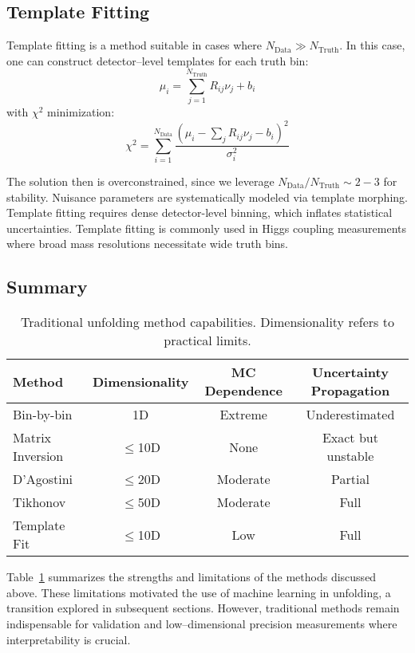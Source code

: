 \subsection{Template Fitting}  
Template fitting is a method suitable in cases where \(N_{\text{Data}} \gg N_{\text{Truth}}\).
%
In this case, one can construct detector--level templates for each truth bin:  
\begin{equation}
    \mu_i = \sum_{j=1}^{N_{\text{Truth}}} R_{ij} \nu_j + b_i
\end{equation}  
with \(\chi^2\) minimization:  
\begin{equation}
    \chi^2 = \sum_{i=1}^{N_{\text{Data}}} \frac{(\mu_i - \sum_j R_{ij}\nu_j - b_i)^2}{\sigma_i^2}
\end{equation}  

The solution then is overconstrained, since we leverage \(N_{\text{Data}}/N_{\text{Truth}} \sim 2-3\) for stability.
%
Nuisance parameters are systematically modeled via template morphing.
%
Template fitting requires dense detector-level binning, which inflates statistical uncertainties. Template fitting is commonly used in Higgs coupling measurements where broad mass resolutions necessitate wide truth bins.

\subsection{Summary}  
\begin{table}
    \centering
    \begin{tabular}{lccc}
        \hline
        Method & Dimensionality & MC Dependence & Uncertainty Propagation \\
        \hline
        Bin-by-bin & 1D & Extreme & Underestimated \\
        Matrix Inversion & $\leq$10D & None & Exact but unstable \\
        D’Agostini & $\leq$20D & Moderate & Partial \\
        Tikhonov & $\leq$50D & Moderate & Full \\
        Template Fit & $\leq$10D & Low & Full \\
        \hline
    \end{tabular}
    \label{tab:binned_comp}
    \caption{Traditional unfolding method capabilities. Dimensionality refers to practical limits.}
\end{table}

Table~\ref{tab:binned_comp} summarizes the strengths and limitations of the methods discussed above.
%
These limitations motivated the use of machine learning in unfolding, a transition explored in subsequent sections.
%
However, traditional methods remain indispensable for validation and low--dimensional precision measurements where interpretability is crucial.


